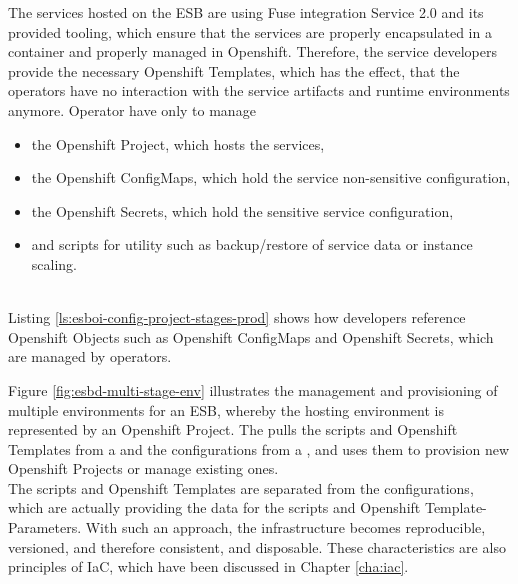 The services hosted on the ESB are using Fuse integration Service 2.0 and its provided tooling, which ensure that the services are properly encapsulated in a container and properly managed in Openshift. Therefore, the service developers provide the necessary Openshift Templates, which has the effect, that the operators have no interaction with the service artifacts and runtime environments anymore. Operator have only to manage
\begin{itemize}
	\item the Openshift Project, which hosts the services,
	\item the Openshift ConfigMaps, which hold the service non-sensitive configuration,
	\item the Openshift Secrets, which hold the sensitive service configuration,
	\item and scripts for utility such as backup/restore of service data or instance scaling.
\end{itemize} 
\ \\
Listing \vref{ls:esboi-config-project-stages-prod} shows how developers reference Openshift Objects such as Openshift ConfigMaps and Openshift Secrets, which are managed by operators. 

Figure \vref{fig:esbd-multi-stage-env} illustrates the management and provisioning of multiple environments for an ESB, whereby the hosting environment is represented by an Openshift Project. The  pulls the scripts and Openshift Templates from a  and the configurations from a , and uses them to provision new Openshift Projects or manage existing ones. \\

The scripts and Openshift Templates are separated from the configurations, which are actually providing the data for the scripts and Openshift Template-Parameters. With such an approach, the infrastructure becomes reproducible, versioned, and therefore consistent, and disposable. These characteristics are also principles of IaC, which have been discussed in Chapter \vref{cha:iac}. 

